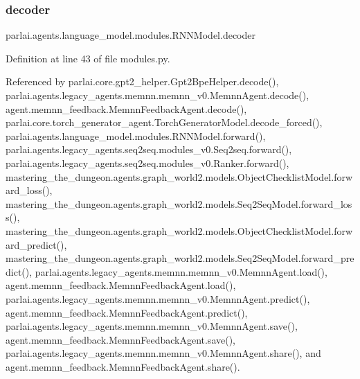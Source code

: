 \subsubsection{\texorpdfstring{decoder}{decoder}}
{\footnotesize\ttfamily parlai.\+agents.\+language\+\_\+model.\+modules.\+R\+N\+N\+Model.\+decoder}



Definition at line 43 of file modules.\+py.



Referenced by parlai.\+core.\+gpt2\+\_\+helper.\+Gpt2\+Bpe\+Helper.\+decode(), parlai.\+agents.\+legacy\+\_\+agents.\+memnn.\+memnn\+\_\+v0.\+Memnn\+Agent.\+decode(), agent.\+memnn\+\_\+feedback.\+Memnn\+Feedback\+Agent.\+decode(), parlai.\+core.\+torch\+\_\+generator\+\_\+agent.\+Torch\+Generator\+Model.\+decode\+\_\+forced(), parlai.\+agents.\+language\+\_\+model.\+modules.\+R\+N\+N\+Model.\+forward(), parlai.\+agents.\+legacy\+\_\+agents.\+seq2seq.\+modules\+\_\+v0.\+Seq2seq.\+forward(), parlai.\+agents.\+legacy\+\_\+agents.\+seq2seq.\+modules\+\_\+v0.\+Ranker.\+forward(), mastering\+\_\+the\+\_\+dungeon.\+agents.\+graph\+\_\+world2.\+models.\+Object\+Checklist\+Model.\+forward\+\_\+loss(), mastering\+\_\+the\+\_\+dungeon.\+agents.\+graph\+\_\+world2.\+models.\+Seq2\+Seq\+Model.\+forward\+\_\+loss(), mastering\+\_\+the\+\_\+dungeon.\+agents.\+graph\+\_\+world2.\+models.\+Object\+Checklist\+Model.\+forward\+\_\+predict(), mastering\+\_\+the\+\_\+dungeon.\+agents.\+graph\+\_\+world2.\+models.\+Seq2\+Seq\+Model.\+forward\+\_\+predict(), parlai.\+agents.\+legacy\+\_\+agents.\+memnn.\+memnn\+\_\+v0.\+Memnn\+Agent.\+load(), agent.\+memnn\+\_\+feedback.\+Memnn\+Feedback\+Agent.\+load(), parlai.\+agents.\+legacy\+\_\+agents.\+memnn.\+memnn\+\_\+v0.\+Memnn\+Agent.\+predict(), agent.\+memnn\+\_\+feedback.\+Memnn\+Feedback\+Agent.\+predict(), parlai.\+agents.\+legacy\+\_\+agents.\+memnn.\+memnn\+\_\+v0.\+Memnn\+Agent.\+save(), agent.\+memnn\+\_\+feedback.\+Memnn\+Feedback\+Agent.\+save(), parlai.\+agents.\+legacy\+\_\+agents.\+memnn.\+memnn\+\_\+v0.\+Memnn\+Agent.\+share(), and agent.\+memnn\+\_\+feedback.\+Memnn\+Feedback\+Agent.\+share().

\mbox{\label{classparlai_1_1agents_1_1language__model_1_1modules_1_1RNNModel_aac342c5f6279b4de077793eecbdff823}} 
